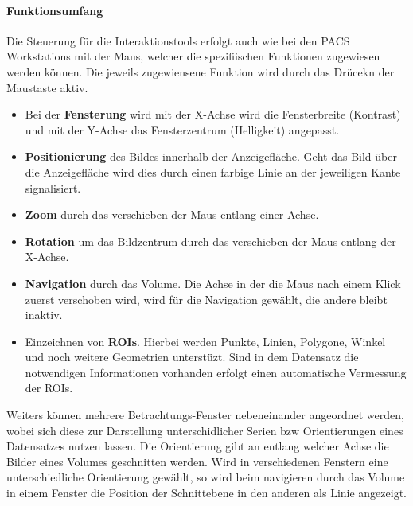 \paragraph{Funktionsumfang}
Die Steuerung für die Interaktionstools erfolgt auch wie bei den PACS Workstations mit der Maus, 
welcher die spezifiischen Funktionen zugewiesen werden können. Die jeweils zugewiensene Funktion wird durch das Drücekn der Maustaste aktiv.
\begin{itemize}
	\item Bei der \textbf{Fensterung} wird mit der X-Achse wird die Fensterbreite (Kontrast) und mit der Y-Achse das Fensterzentrum (Helligkeit) angepasst.
	\item \textbf{Positionierung} des Bildes innerhalb der Anzeigefläche. Geht das Bild über die Anzeigefläche wird dies durch einen farbige Linie an der jeweiligen Kante signalisiert.
	\item \textbf{Zoom} durch das verschieben der Maus entlang einer Achse.
	\item \textbf{Rotation} um das Bildzentrum durch das verschieben der Maus entlang der X-Achse.
	\item \textbf{Navigation} durch das Volume. Die Achse in der die Maus nach einem Klick zuerst verschoben wird, wird für die Navigation gewählt, die andere bleibt inaktiv.
	\item Einzeichnen von \textbf{ROIs}. Hierbei werden Punkte, Linien, Polygone, Winkel und noch weitere Geometrien unterstüzt. 
		Sind in dem Datensatz die notwendigen Informationen vorhanden erfolgt einen automatische Vermessung der ROIs.
\end{itemize}
Weiters können mehrere Betrachtungs-Fenster nebeneinander angeordnet werden, wobei sich diese zur Darstellung unterschidlicher Serien bzw Orientierungen eines Datensatzes nutzen lassen. 
Die Orientierung gibt an entlang welcher Achse die Bilder eines Volumes geschnitten werden.
Wird in verschiedenen Fenstern eine unterschiedliche Orientierung gewählt,
so wird beim navigieren durch das Volume in einem Fenster die Position der Schnittebene in den anderen als Linie angezeigt.



